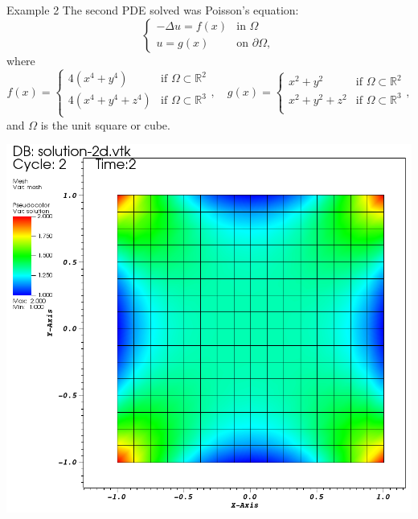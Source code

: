 \documentclass[9pt]{beamer}
\newcommand{\Real}{\mathbb R}
\newcommand{\lap}{\Delta}
\begin{document}
\begin{frame}{Example 2}
The second PDE solved was Poisson's equation:
$$
\begin{cases}
-\lap u = f(x) &\text{in }\Omega\\
u = g(x) & \text{on }\partial\Omega,
\end{cases}
$$
where 
$$
	f(x) = \begin{cases}
	4(x^4 + y^4) & \text{if } \Omega \subset \Real^2\\
	4(x^4 + y^4 + z^4) & \text{if } \Omega \subset \Real^3\\
	\end{cases}, \quad 
	g(x) = \begin{cases}
	x^2 + y^2 & \text{if } \Omega \subset \Real^2\\
	x^2 + y^2 + z^2 & \text{if } \Omega \subset \Real^3\\
	\end{cases},
$$ and $\Omega$ is the unit square or cube.


\centering
\includegraphics[scale=.7]{Solu2-2d.png}
\end{frame}
\end{document}
